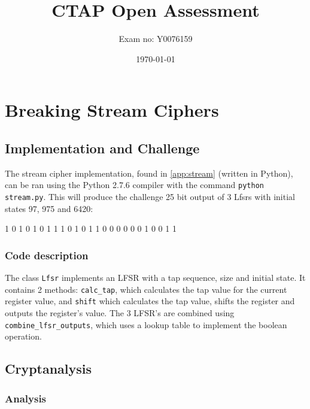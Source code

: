 \documentclass[british,11pt,a4paper]{article}
\begin{document}
\title{CTAP Open Assessment}
\author{Exam no: Y0076159}
\date{\today}
\maketitle
\tableofcontents
\clearpage
\section{Breaking Stream Ciphers}
\subsection{Implementation and Challenge}
The stream cipher implementation, found in \autoref{app:stream} (written in Python),
can be ran using the Python 2.7.6 compiler with the command \lstinline{python stream.py}. This will produce the
challenge 25 bit output of 3 Lfsrs with initial states 97, 975 and 6420:

1 0 1 0 1 0 1 1 1 0 1 0 1 1 0 0 0 0 0 0 1 0 0 1 1

\subsubsection{Code description}
The class \lstinline{Lfsr} implements an LFSR with a tap sequence, size and initial state. It contains 2 methods:
\lstinline{calc_tap}, which calculates the tap value for the current register value, and \lstinline{shift} which
calculates the tap value, shifts the register and outputs the register's value. The 3 LFSR's are combined using
\lstinline{combine_lfsr_outputs}, which uses a lookup table to implement the boolean operation.

\subsection{Cryptanalysis}
\subsubsection{Analysis}
\end{document}
